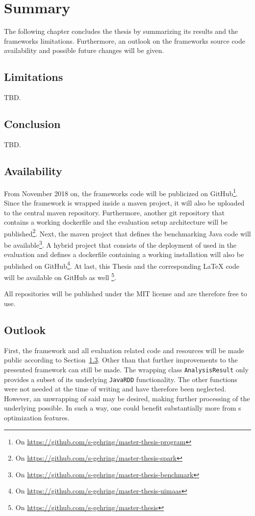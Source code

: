 \chapter{Summary}\label{ch:summary}
The following chapter concludes the thesis by summarizing its results and the frameworks limitations. Furthermore, an outlook on the frameworks source code availability and possible future changes will be given.

\section{Limitations}
TBD.

\section{Conclusion}

TBD.


\section{Availability}
\label{sec:availability}
From November 2018 on, the frameworks code will be publicized on GitHub\footnote{On \url{https://github.com/s-gehring/master-thesis-program}}. Since the framework is wrapped inside a maven project, it will also be uploaded to the central maven repository. Furthermore, another git repository that contains a working \spark{} dockerfile and the evaluation setup architecture will be published\footnote{On \url{https://github.com/s-gehring/master-thesis-spark}}. Next, the maven project that defines the benchmarking Java code will be available\footnote{On \url{https://github.com/s-gehring/master-thesis-benchmark}}. A hybrid project that consists of the deployment of \uimaas{} used in the evaluation and defines a dockerfile containing a working \uimaas{} installation will also be published on GitHub\footnote{On \url{https://github.com/s-gehring/master-thesis-uimaas}}. At last, this Thesis and the corresponding \LaTeX{} code will be available on GitHub as well \footnote{On \url{https://github.com/s-gehring/master-thesis}}.

All repositories will be published under the MIT license and are therefore free to use.

\section{Outlook}
First, the framework and all evaluation related code and resources will be made public according to Section~\ref{sec:availability}. Other than that further improvements to the presented framework can still be made. The wrapping class \lstinline|AnalysisResult| only provides a subset of its underlying \lstinline|JavaRDD| functionality. The other functions were not needed at the time of writing and have therefore been neglected. However, an unwrapping of said \rdd{} may be desired, making further processing of the underlying \cas{} possible. In such a way, one could benefit substantially more from \spark{}s optimization features.

